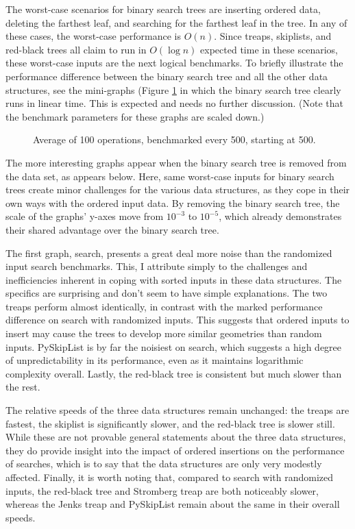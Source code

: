 \documentclass{article}
\begin{document}
The worst-case scenarios for binary search trees are inserting ordered data, deleting the farthest leaf, and searching for the farthest leaf in the tree. In any of these cases, the worst-case performance is $O(n)$. Since treaps, skiplists, and red-black trees all claim to run in $O(\log n)$ expected time in these scenarios, these worst-case inputs are the next logical benchmarks. To briefly illustrate the performance difference between the binary search tree and all the other data structures, see the mini-graphs (Figure \ref{fig:worst_case} in which the binary search tree clearly runs in linear time. This is expected and needs no further discussion. (Note that the benchmark parameters for these graphs are scaled down.)

\begin{figure}[h!]
    \centering
    
    
    
    \caption{Average of 100 operations, benchmarked every 500, starting at 500.}
    \label{fig:worst_case}
\end{figure}

The more interesting graphs appear when the binary search tree is removed from the data set, as appears below. Here, same worst-case inputs for binary search trees create minor challenges for the various data structures, as they cope in their own ways with the ordered input data. By removing the binary search tree, the scale of the graphs' y-axes move from $10^{-3}$ to $10^{-5}$, which already demonstrates their shared advantage over the binary search tree.



The first graph, search, presents a great deal more noise than the randomized input search benchmarks. This, I attribute simply to the challenges and inefficiencies inherent in coping with sorted inputs in these data structures. The specifics are surprising and don't seem to have simple explanations. The two treaps perform almost identically, in contrast with the marked performance difference on search with randomized inputs. This suggests that ordered inputs to insert may cause the trees to develop more similar geometries than random inputs. PySkipList is by far the noisiest on search, which suggests a high degree of unpredictability in its performance, even as it maintains logarithmic complexity overall. Lastly, the red-black tree is consistent but much slower than the rest.

The relative speeds of the three data structures remain unchanged: the treaps are fastest, the skiplist is significantly slower, and the red-black tree is slower still. While these are not provable general statements about the three data structures, they do provide insight into the impact of ordered insertions on the performance of searches, which is to say that the data structures are only very modestly affected. Finally, it is worth noting that, compared to search with randomized inputs, the red-black tree and Stromberg treap are both noticeably slower, whereas the Jenks treap and PySkipList remain about the same in their overall speeds.
\end{document}
